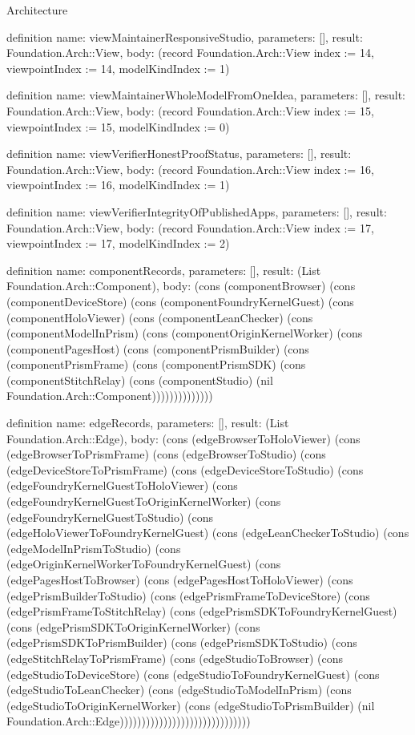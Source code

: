 \begin{lexlean}{Architecture}
\begin{semanticmodule}
definition{
  name: viewMaintainerResponsiveStudio,
  parameters: [],
  result: Foundation.Arch::View,
  body: (record Foundation.Arch::View {index := 14, viewpointIndex := 14, modelKindIndex := 1})
}

definition{
  name: viewMaintainerWholeModelFromOneIdea,
  parameters: [],
  result: Foundation.Arch::View,
  body: (record Foundation.Arch::View {index := 15, viewpointIndex := 15, modelKindIndex := 0})
}

definition{
  name: viewVerifierHonestProofStatus,
  parameters: [],
  result: Foundation.Arch::View,
  body: (record Foundation.Arch::View {index := 16, viewpointIndex := 16, modelKindIndex := 1})
}

definition{
  name: viewVerifierIntegrityOfPublishedApps,
  parameters: [],
  result: Foundation.Arch::View,
  body: (record Foundation.Arch::View {index := 17, viewpointIndex := 17, modelKindIndex := 2})
}

definition{
  name: componentRecords,
  parameters: [],
  result: (List Foundation.Arch::Component),
  body: (cons (componentBrowser) (cons (componentDeviceStore) (cons (componentFoundryKernelGuest) (cons (componentHoloViewer) (cons (componentLeanChecker) (cons (componentModelInPrism) (cons (componentOriginKernelWorker) (cons (componentPagesHost) (cons (componentPrismBuilder) (cons (componentPrismFrame) (cons (componentPrismSDK) (cons (componentStitchRelay) (cons (componentStudio) (nil Foundation.Arch::Component))))))))))))))
}

definition{
  name: edgeRecords,
  parameters: [],
  result: (List Foundation.Arch::Edge),
  body: (cons (edgeBrowserToHoloViewer) (cons (edgeBrowserToPrismFrame) (cons (edgeBrowserToStudio) (cons (edgeDeviceStoreToPrismFrame) (cons (edgeDeviceStoreToStudio) (cons (edgeFoundryKernelGuestToHoloViewer) (cons (edgeFoundryKernelGuestToOriginKernelWorker) (cons (edgeFoundryKernelGuestToStudio) (cons (edgeHoloViewerToFoundryKernelGuest) (cons (edgeLeanCheckerToStudio) (cons (edgeModelInPrismToStudio) (cons (edgeOriginKernelWorkerToFoundryKernelGuest) (cons (edgePagesHostToBrowser) (cons (edgePagesHostToHoloViewer) (cons (edgePrismBuilderToStudio) (cons (edgePrismFrameToDeviceStore) (cons (edgePrismFrameToStitchRelay) (cons (edgePrismSDKToFoundryKernelGuest) (cons (edgePrismSDKToOriginKernelWorker) (cons (edgePrismSDKToPrismBuilder) (cons (edgePrismSDKToStudio) (cons (edgeStitchRelayToPrismFrame) (cons (edgeStudioToBrowser) (cons (edgeStudioToDeviceStore) (cons (edgeStudioToFoundryKernelGuest) (cons (edgeStudioToLeanChecker) (cons (edgeStudioToModelInPrism) (cons (edgeStudioToOriginKernelWorker) (cons (edgeStudioToPrismBuilder) (nil Foundation.Arch::Edge))))))))))))))))))))))))))))))
}


\end{semanticmodule}
\end{lexlean}
